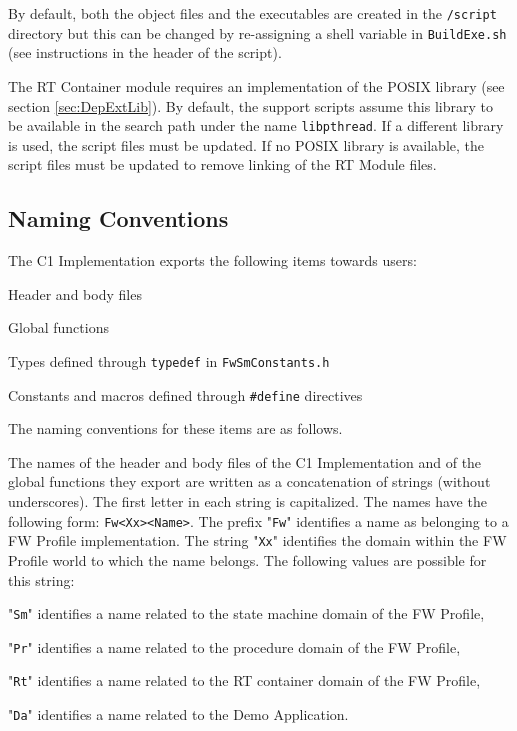 \documentclass[a4paper,10pt]{article}
\newenvironment{fw_itemize}						%
{\begin{itemize}
  \setlength{\itemsep}{1mm}
  \setlength{\parskip}{0pt}
  \setlength{\parsep}{0pt}}
{\end{itemize}}
\begin{document}
By default, both the object files and the executables are created in the \texttt{/script} directory but this can be changed by re-assigning a shell variable in \texttt{BuildExe.sh} (see instructions in the header of the script).

The RT Container module requires an implementation of the POSIX library (see section \ref{sec:DepExtLib}). By default, the support scripts assume this library to be available in the search path under the name \texttt{libpthread}. If a different library is used, the script files must be updated. If no POSIX library is available, the script files must be updated to remove linking of the RT Module files. 

\subsection{Naming Conventions}
The C1 Implementation exports the following items towards users:

\begin{fw_itemize}
\item Header and body files
\item Global functions
\item Types defined through \texttt{typedef} in \texttt{FwSmConstants.h}
\item Constants and macros defined through \texttt{\#define} directives
\end{fw_itemize}

The naming conventions for these items are as follows.
 
The names of the header and body files of the C1 Implementation and of the global 
functions they export are written as a concatenation of strings (without underscores). 
The first letter in each string is capitalized. The names have the following form: 
\texttt{Fw<Xx><Name>}. The prefix "\texttt{Fw}" identifies a name as belonging to a FW Profile 
implementation. The string "\texttt{Xx}" identifies the domain within the FW Profile world 
to which the name belongs. The following values are possible for this string: 

\begin{fw_itemize}
\item "\texttt{Sm}" identifies a name related to the state machine domain of the FW Profile, 
\item "\texttt{Pr}" identifies a name related to the procedure domain of the FW Profile,  
\item "\texttt{Rt}" identifies a name related to the RT container domain of the FW Profile,  
\item "\texttt{Da}" identifies a name related to the Demo Application.
\end{fw_itemize}
\end{document}
